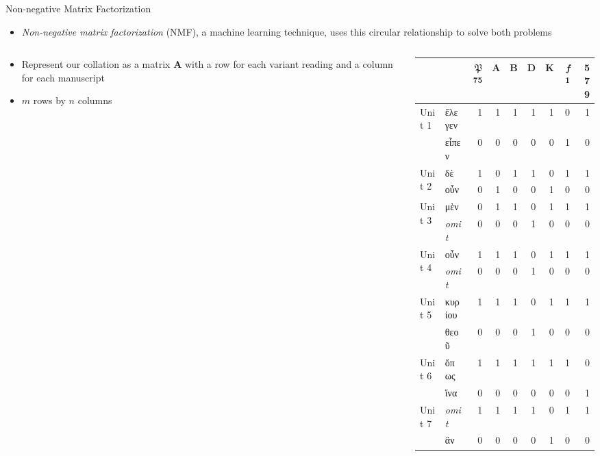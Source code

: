 \documentclass[10pt]{beamer}
\begin{document}
	\begin{frame}{Non-negative Matrix Factorization}
		\begin{itemize}
			\item \emph{Non-negative matrix factorization} (NMF), a machine learning technique, uses this circular relationship to solve both problems
		\end{itemize}
		\begin{columns}[T]
			\begin{column}{0.3\textwidth}
				\begin{itemize}
					\item Represent our collation as a matrix $\mathbf{A}$ with a row for each variant reading and a column for each manuscript
					\item $m$ rows by $n$ columns
				\end{itemize}
			\end{column}
			\begin{column}{0.6\textwidth}
				\matrixfont
				\footnotesize
				\setlength{\tabcolsep}{5pt}
				\begin{tabular}{ll|rrrrrrr}
					 & & $\mathfrak{P}$\textsuperscript{75}& A & B & D & K & \emph{f}\textsuperscript{1} & 579\\
					\hline
					\multirow{2}{*}{Unit 1} & ἔλεγεν & 1 & 1 & 1 & 1 & 1 & 0 & 1\\
					& εἶπεν & 0 & 0 & 0 & 0 & 0 & 1 & 0\\
					\hline
					\multirow{2}{*}{Unit 2} & δὲ & 1 & 0 & 1 & 1 & 0 & 1 & 1\\
					 & οὖν & 0 & 1 & 0 & 0 & 1 & 0 & 0\\
					\hline
					\multirow{2}{*}{Unit 3} & μὲν & 0 & 1 & 1 & 0 & 1 & 1 & 1\\
					 & \emph{omit} & 0 & 0 & 0 & 1 & 0 & 0 & 0\\
					\hline
					\multirow{2}{*}{Unit 4} & οὖν & 1 & 1 & 1 & 0 & 1 & 1 & 1\\
					 & \emph{omit} & 0 & 0 & 0 & 1 & 0 & 0 & 0\\
					\hline
					\multirow{2}{*}{Unit 5} & κυρίου & 1 & 1 & 1 & 0 & 1 & 1 & 1\\
					 & θεοῦ & 0 & 0 & 0 & 1 & 0 & 0 & 0\\
					\hline
					\multirow{2}{*}{Unit 6} & ὅπως & 1 & 1 & 1 & 1 & 1 & 1 & 0\\
					 & ἵνα & 0 & 0 & 0 & 0 & 0 & 0 & 1\\
					\hline
					\multirow{2}{*}{Unit 7} & \emph{omit} & 1 & 1 & 1 & 1 & 0 & 1 & 1\\
					 & ἂν & 0 & 0 & 0 & 0 & 1 & 0 & 0\\
				\end{tabular}
			\end{column}
		\end{columns}
	\end{frame}
\end{document}
